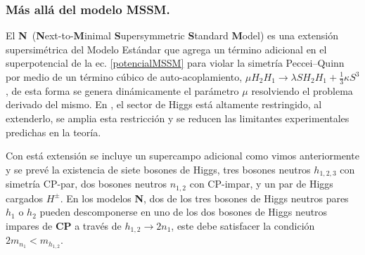 
\subsubsection{Más allá del modelo MSSM.}
El \textbf{N}\MSSM~(\textbf{N}ext-to-\textbf{M}inimal \textbf{S}upersymmetric \textbf{S}tandard \textbf{M}odel) es una extensión supersimétrica del Modelo Estándar que agrega un término adicional en el superpotencial de la ec. \ref{potencialMSSM} para violar la simetría Peccei–Quinn por medio de un término cúbico de auto-acoplamiento, $\mu H_2 H_1 \rightarrow \lambda S H_2 H_1 + \frac{1}{3} \kappa S^3$ \citep{cms_collaboration_search_2019-1}, de esta forma se genera dinámicamente el parámetro $\mu$ resolviendo el problema derivado del mismo. En \MSSM, el sector de Higgs está altamente restringido, al extenderlo, se amplia esta restricción y se reducen las limitantes experimentales predichas en la teoría. 

Con está extensión se incluye un supercampo adicional como vimos anteriormente y se prevé la existencia de siete bosones de Higgs, tres bosones neutros $h_{1,2,3}$ con simetría CP-par, dos bosones neutros $n_{1,2}$ con CP-impar, y un par de Higgs cargados $H^\pm$. En los modelos \textbf{N}\MSSM, dos de los tres bosones de Higgs neutros pares $h_1$ o $h_2$  pueden descomponerse en uno de los dos bosones de Higgs neutros impares de \textbf{CP} a través de $h_{1,2} \rightarrow 2n_1$, este debe satisfacer la condición $2m_{n_1} < m_{h_{1,2}}$.




